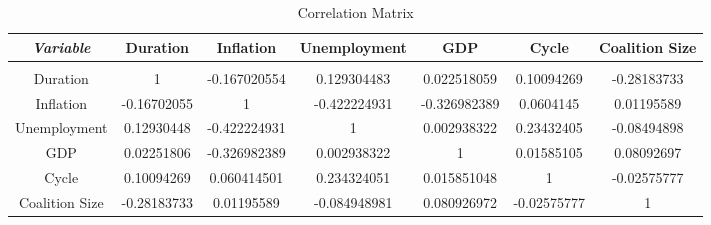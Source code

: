 \documentclass[12pt,a4paper]{article}
\begin{document}

\begin{table}[htbp] \centering 
	\footnotesize
  \caption{Correlation Matrix} 
  \label{matrix1} 
\begin{tabular}{c|cccccc} 
\hline\hline 
\multicolumn{1}{c|}{\emph{Variable}}  & \multicolumn{1}{c}{Duration} & \multicolumn{1}{c}{Inflation} & \multicolumn{1}{c}{Unemployment} & \multicolumn{1}{c}{GDP} & \multicolumn{1}{c}{Cycle} & \multicolumn{1}{c}{Coalition Size} \\ 
\hline \\[-1.8ex]
Duration	&	1	&	-0.167020554	&	0.129304483	&	0.022518059	&	0.10094269	&	-0.28183733	\\
Inflation	&	-0.16702055	&	1	&	-0.422224931	&	-0.326982389	&	0.0604145	&	0.01195589	\\
Unemployment	&	0.12930448	&	-0.422224931	&	1	&	0.002938322	&	0.23432405	&	-0.08494898	\\
GDP	&	0.02251806	&	-0.326982389	&	0.002938322	&	1	&	0.01585105	&	0.08092697	\\
Cycle	&	0.10094269	&	0.060414501	&	0.234324051	&	0.015851048	&	1	&	-0.02575777	\\
Coalition Size	&	-0.28183733	&	0.01195589	&	-0.084948981	&	0.080926972	&	-0.02575777	&	1	\\
\hline 
\end{tabular} 
\end{table} 


\end{document}
